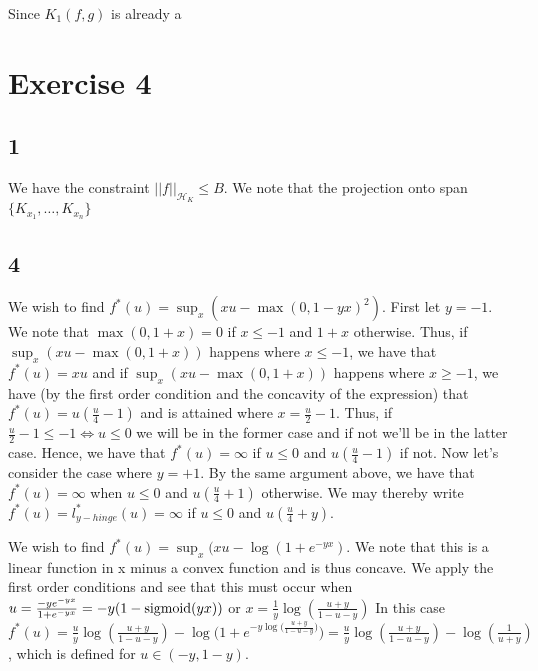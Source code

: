 \documentclass[12pt]{article}
\begin{document}
Since $K_1(f,g)$ is already a 


\section{Exercise 4}
\subsection{1}
We have the constraint $||f||_{\mathcal{H}_K} \leq B$. We note that the projection onto span$\{K_{x_1},\ldots, K_{x_n}\}$



\subsection{4}
We wish to find $f^*(u) = \sup_x (xu - \max(0, 1-yx)^2)$. First let $y=-1$. We note that $\max(0, 1+x) = 0$ if $x\leq -1$ and $1+x$ otherwise. Thus, if $\sup_x (xu-\max(0,1+x))$ happens where $x \leq -1$, we have that $f^*(u) = xu$ and if $\sup_x (xu-\max(0,1+x))$ happens where $x \geq -1$, we have (by the first order condition and the concavity of the expression) that $f^*(u) = u(\frac{u}{4} -1)$ and is attained where $x = \frac{u}{2} -1$. Thus, if $\frac{u}{2} -1 \leq -1 \iff u\leq 0$ we will be in the former case and if not we'll be in the latter case. Hence, we have that $f^*(u) = \infty $ if $u \leq 0$ and $u(\frac{u}{4}-1)$ if not. Now let's consider the case where $y=+1$. By the same argument above, we have that $f^*(u) = \infty$ when $u \leq 0$ and $u(\frac{u}{4} + 1)$ otherwise. We may thereby write $f^*(u) = l_{y-hinge}^*(u) = \infty$ if $u\leq 0$ and $u(\frac{u}{4} + y)$.

We wish to find $f^*(u) = \sup_x(xu - \log(1+e^{-yx})$. We note that this is a linear function in x minus a convex function and is thus concave. We apply the first order conditions and see that this must occur when $u = \frac{-y e^{-yx}}{1+e^{-yx}}  = -y(1-\textnormal{sigmoid}(yx))$ or $x = \frac{1}{y} \log (\frac{u+y}{1-u-y})$ In this case $f^*(u) = \frac{u}{y}\log (\frac{u+y}{1-u-y}) - \log \big(1+ e^{-y\log \big(\frac{u+y}{1-u-y}\big)}\big) = \frac{u}{y} \log(\frac{u+y}{1-u-y}) - \log (\frac{1}{u+y})$, which is defined for $u \in (-y, 1-y)$. 
\end{document}
